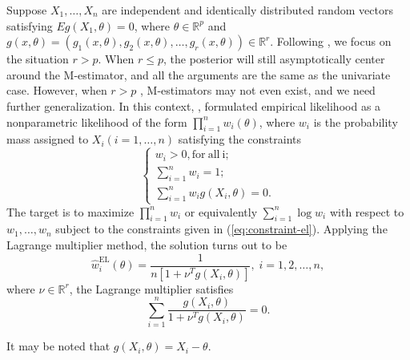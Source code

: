 Suppose $X_{1},\ldots,X_{n}$ are independent and identically distributed
random vectors satisfying $Eg\left(X_{1},\theta\right)=0$, where
$\theta\in\mathbb{R}^{p}$ and $g\left(x,\theta\right)=\left(g_{1}\left(x,\theta\right),g_{2}\left(x,\theta\right),\ldots,g_{r}\left(x,\theta\right)\right)\in\mathbb{R}^{r}$.
Following \citet{qin1994empirical}, we focus on the situation $r>p$.
When $r\le p$, the posterior will still asymptotically center around
the M-estimator, and all the arguments are the same as the univariate case.
However, when $r>p$ , M-estimators may not even exist, and we need further
generalization. In this context, \citet{owen1988empirical}, formulated
empirical likelihood as a nonparametric likelihood of the form $\prod_{i=1}^{n}w_{i}\left(\theta\right)$,
where $w_{i}$ is the probability mass assigned to $X_{i}\left(i=1,\ldots,n\right)$
satisfying the constraints 
\begin{equation}
\begin{cases}
w_{i}>0,\mathrm{for\: all\: i;}\\
\sum_{i=1}^{n}w_{i}=1;\\
\sum_{i=1}^{n}w_{i}g\left(X_{i},\theta\right)=0.
\end{cases}\label{eq:constraint-el}
\end{equation}
The target is to maximize $\prod_{i=1}^{n}w_{i}$ or equivalently
$\sum_{i=1}^{n}\log w_{i}$ with respect to $w_{1},\ldots,w_{n}$
subject to the constraints given in (\ref{eq:constraint-el}). Applying
the Lagrange multiplier method, the solution turns out to be 
\begin{equation}
\hat{w}_{i}^{\mathrm{EL}}\left(\theta\right)=\frac{1}{n\left[1+\nu^{T}g\left(X_{i},\theta\right)\right]},\; i=1,2,\ldots,n,\label{eq:sol-emp-lik}
\end{equation}
where $\nu\in\mathbb{R}^{r}$, the Lagrange multiplier satisfies 
\begin{equation}
\sum_{i=1}^{n}\frac{g\left(X_{i},\theta\right)}{1+\nu^{T}g\left(X_{i},\theta\right)}=0.\label{eq:lambda-eq}
\end{equation}


It may be noted that \citet{fang2005expected,fang2006empirical} $g\left(X_{i},\theta\right)=X_{i}-\theta$. 

